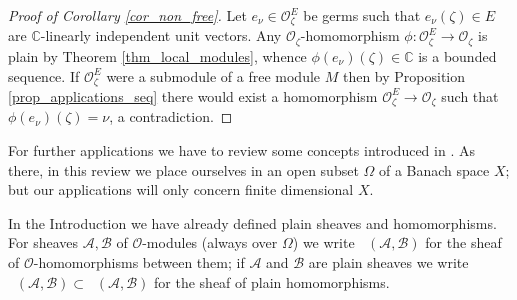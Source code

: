 \documentclass{amsart}
\numberwithin{equation}{section}
\theoremstyle{definition}
\theoremstyle{plain}
\theoremstyle{remark}
\begin{document}
\begin{proof}[Proof of Corollary \ref{cor_non_free}]
Let $e_\nu\in{\ensuremath{\mathcal{{O}}}}_\zeta^E$ be germs such that $e_\nu(\zeta)\in E$
are $\mathbb{C}$-linearly independent unit vectors.
Any ${\ensuremath{\mathcal{{O}}}}_\zeta$-homomorphism 
$\phi:{\ensuremath{\mathcal{{O}}}}^E_\zeta\rightarrow{\ensuremath{\mathcal{{O}}}}_\zeta$
is plain by Theorem \ref{thm_local_modules}, whence $\phi(e_\nu)(\zeta)\in\mathbb{C}$
is a bounded sequence. If ${\ensuremath{\mathcal{{O}}}}^E_\zeta$ were a submodule of a 
free module $M$ then by Proposition \ref{prop_applications_seq}
there would exist a homomorphism ${\ensuremath{\mathcal{{O}}}}_\zeta^E \rightarrow{\ensuremath{\mathcal{{O}}}}_\zeta$
such that $\phi(e_\nu)(\zeta)=\nu$, a contradiction.
\end{proof}

For further applications we have to review some concepts introduced in 
\cite{LP}.
As there, in this review we place ourselves in an open subset $\Omega$ of a
Banach space $X$; but our applications will only concern finite
dimensional $X$.

In the Introduction we have already defined plain sheaves and homomorphisms.
For sheaves ${\ensuremath{\mathcal{{A}}}},{\ensuremath{\mathcal{{B}}}}$ of ${\ensuremath{\mathcal{{O}}}}$-modules (always over $\Omega$)
we write 
${{\mathop{\mathbf{Hom}_{\ensuremath{\mathcal{{O}}}}}}}({\ensuremath{\mathcal{{A}}}},{\ensuremath{\mathcal{{B}}}})$ for the sheaf of ${\ensuremath{\mathcal{{O}}}}$-homomorphisms 
between them; if ${\ensuremath{\mathcal{{A}}}}$ and ${\ensuremath{\mathcal{{B}}}}$ are plain sheaves we write
${{\mathop{\mathbf{Hom}_\mathrm{plain}}}}({\ensuremath{\mathcal{{A}}}},{\ensuremath{\mathcal{{B}}}})\subset{{\mathop{\mathbf{Hom}_{\ensuremath{\mathcal{{O}}}}}}}({\ensuremath{\mathcal{{A}}}},{\ensuremath{\mathcal{{B}}}})$ for the sheaf of plain homomorphisms.
\end{document}
